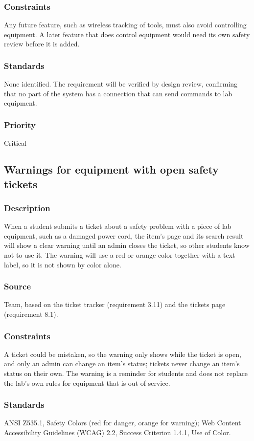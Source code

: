 \subsubsection{Constraints}
Any future feature, such as wireless tracking of tools, must also avoid controlling equipment. A later feature that does control equipment would need its own safety review before it is added.
\subsubsection{Standards}
None identified. The requirement will be verified by design review, confirming that no part of the system has a connection that can send commands to lab equipment.
\subsubsection{Priority}
Critical

\subsection{Warnings for equipment with open safety tickets}
\subsubsection{Description}
When a student submits a ticket about a safety problem with a piece of lab equipment, such as a damaged power cord, the item's page and its search result will show a clear warning until an admin closes the ticket, so other students know not to use it. The warning will use a red or orange color together with a text label, so it is not shown by color alone.
\subsubsection{Source}
Team, based on the ticket tracker (requirement 3.11) and the tickets page (requirement 8.1).
\subsubsection{Constraints}
A ticket could be mistaken, so the warning only shows while the ticket is open, and only an admin can change an item's status; tickets never change an item's status on their own. The warning is a reminder for students and does not replace the lab's own rules for equipment that is out of service.
\subsubsection{Standards}
ANSI Z535.1, Safety Colors (red for danger, orange for warning); Web Content Accessibility Guidelines (WCAG) 2.2, Success Criterion 1.4.1, Use of Color.
